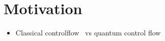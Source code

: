 \chapter{Motivation}
\begin{itemize}
    \item Classical controlflow~\cite{ACR*10} vs quantum control flow~\cite{YYF12}
\end{itemize}